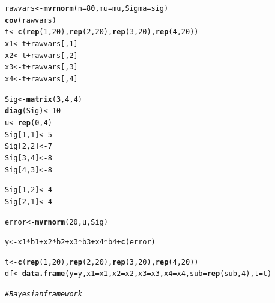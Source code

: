 \documentclass[11pt,a4paper,twoside]{book}\usepackage[]{graphicx}\usepackage[]{color}
\makeatletter
\newcommand{\hlnum}[1]{\textcolor[rgb]{0.686,0.059,0.569}{#1}}%
\newcommand{\hlcom}[1]{\textcolor[rgb]{0.678,0.584,0.686}{\textit{#1}}}%
\newcommand{\hlopt}[1]{\textcolor[rgb]{0,0,0}{#1}}%
\newcommand{\hlstd}[1]{\textcolor[rgb]{0.345,0.345,0.345}{#1}}%
\newcommand{\hlkwb}[1]{\textcolor[rgb]{0.69,0.353,0.396}{#1}}%
\newcommand{\hlkwc}[1]{\textcolor[rgb]{0.333,0.667,0.333}{#1}}%
\newcommand{\hlkwd}[1]{\textcolor[rgb]{0.737,0.353,0.396}{\textbf{#1}}}%
\newenvironment{kframe}{%
 \def\at@end@of@kframe{}%
 \ifinner\ifhmode%
  \def\at@end@of@kframe{\end{minipage}}%
  \begin{minipage}{\columnwidth}%
 \fi\fi%
 \def\FrameCommand##1{\hskip\@totalleftmargin \hskip-\fboxsep
 \colorbox{shadecolor}{##1}\hskip-\fboxsep
     \hskip-\linewidth \hskip-\@totalleftmargin \hskip\columnwidth}%
 \MakeFramed {\advance\hsize-\width
   \@totalleftmargin\z@ \linewidth\hsize
   \@setminipage}}%
 {\par\unskip\endMakeFramed%
 \at@end@of@kframe}
\newenvironment{knitrout}{}{} %
\makeatother
\begin{document}
\begin{knitrout}
\begin{kframe}
\begin{alltt}
\hlstd{rawvars} \hlkwb{<-} \hlkwd{mvrnorm}\hlstd{(}\hlkwc{n}\hlstd{=}\hlnum{80}\hlstd{,} \hlkwc{mu}\hlstd{=mu,} \hlkwc{Sigma}\hlstd{=sig)}
\hlkwd{cov}\hlstd{(rawvars)}
\hlstd{t} \hlkwb{<-} \hlkwd{c}\hlstd{(}\hlkwd{rep}\hlstd{(}\hlnum{1}\hlstd{,} \hlnum{20}\hlstd{),}\hlkwd{rep}\hlstd{(}\hlnum{2}\hlstd{,}\hlnum{20}\hlstd{),} \hlkwd{rep}\hlstd{(}\hlnum{3}\hlstd{,} \hlnum{20}\hlstd{),} \hlkwd{rep}\hlstd{(}\hlnum{4}\hlstd{,} \hlnum{20}\hlstd{))}
\hlstd{x1} \hlkwb{<-} \hlstd{t}\hlopt{+}\hlstd{rawvars[,}\hlnum{1}\hlstd{]}
\hlstd{x2} \hlkwb{<-} \hlstd{t}\hlopt{+}\hlstd{rawvars[,}\hlnum{2}\hlstd{]}
\hlstd{x3} \hlkwb{<-} \hlstd{t}\hlopt{+}\hlstd{rawvars[,}\hlnum{3}\hlstd{]}
\hlstd{x4} \hlkwb{<-} \hlstd{t}\hlopt{+}\hlstd{rawvars[,}\hlnum{4}\hlstd{]}

\hlstd{Sig}\hlkwb{<-} \hlkwd{matrix}\hlstd{(}\hlnum{3}\hlstd{,} \hlnum{4}\hlstd{,}\hlnum{4}\hlstd{)}
\hlkwd{diag}\hlstd{(Sig)} \hlkwb{<-} \hlnum{10}
\hlstd{u} \hlkwb{<-} \hlkwd{rep}\hlstd{(}\hlnum{0}\hlstd{,} \hlnum{4}\hlstd{)}
\hlstd{Sig[}\hlnum{1}\hlstd{,}\hlnum{1}\hlstd{]} \hlkwb{<-} \hlnum{5}
\hlstd{Sig[}\hlnum{2}\hlstd{,}\hlnum{2}\hlstd{]} \hlkwb{<-} \hlnum{7}
\hlstd{Sig[}\hlnum{3}\hlstd{,}\hlnum{4}\hlstd{]} \hlkwb{<-} \hlnum{8}
\hlstd{Sig[}\hlnum{4}\hlstd{,}\hlnum{3}\hlstd{]} \hlkwb{<-} \hlnum{8}

\hlstd{Sig[}\hlnum{1}\hlstd{,}\hlnum{2}\hlstd{]} \hlkwb{<-} \hlnum{4}
\hlstd{Sig[}\hlnum{2}\hlstd{,}\hlnum{1}\hlstd{]} \hlkwb{<-}\hlnum{4}


\hlstd{error} \hlkwb{<-} \hlkwd{mvrnorm}\hlstd{(}\hlnum{20}\hlstd{, u, Sig)}

\hlstd{y}\hlkwb{<-} \hlstd{x1}\hlopt{*}\hlstd{b1} \hlopt{+}\hlstd{x2}\hlopt{*}\hlstd{b2} \hlopt{+} \hlstd{x3}\hlopt{*}\hlstd{b3} \hlopt{+}\hlstd{x4}\hlopt{*}\hlstd{b4} \hlopt{+}\hlkwd{c}\hlstd{(error)}


\hlstd{t} \hlkwb{<-} \hlkwd{c}\hlstd{(}\hlkwd{rep}\hlstd{(}\hlnum{1}\hlstd{,} \hlnum{20}\hlstd{),} \hlkwd{rep}\hlstd{(}\hlnum{2}\hlstd{,} \hlnum{20}\hlstd{),} \hlkwd{rep}\hlstd{(}\hlnum{3}\hlstd{,} \hlnum{20}\hlstd{),} \hlkwd{rep}\hlstd{(}\hlnum{4}\hlstd{,} \hlnum{20}\hlstd{))}
\hlstd{df} \hlkwb{<-} \hlkwd{data.frame}\hlstd{(}\hlkwc{y}\hlstd{=y,} \hlkwc{x1} \hlstd{= x1,} \hlkwc{x2}\hlstd{=x2 ,} \hlkwc{x3} \hlstd{= x3,} \hlkwc{x4} \hlstd{= x4,} \hlkwc{sub} \hlstd{=} \hlkwd{rep}\hlstd{(sub,}\hlnum{4}\hlstd{),} \hlkwc{t} \hlstd{=t)}






\hlcom{# Bayesian framework}


\end{alltt}
\end{kframe}
\end{knitrout}
\end{document}
